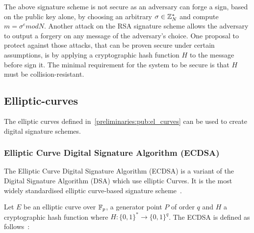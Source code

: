 The above signature scheme is not secure as an adversary can forge a sign, based on the public key alone, by choosing an arbitrary $\sigma \in \mathbb{Z}^{*}_{N}$ and compute $m = \sigma^{e}modN$. Another attack on the RSA signature scheme allows the adversary to output a forgery on any message of the adversary's choice. One proposal to protect against those attacks, that can be proven secure under certain assumptions, is by applying a cryptographic hash function $H$ to the message before sign it. The minimal requirement for the system to be secure is that $H$ must be collision-resistant.

\subsection{Elliptic-curves}
\label{preliminaries:sign:el_curves}

The elliptic curves defined in~\ref{preliminaries:pub:el_curves} can be used to create digital signature schemes.

\subsubsection{Elliptic Curve Digital Signature Algorithm (ECDSA)}
\label{preliminaries:sign:el_curves:ecdsa}

The Elliptic Curve Digital Signature Algorithm (ECDSA) is a variant of the Digital Signature Algorithm (DSA) which use elliptic Curves. It is the most widely standardised elliptic curve-based signature scheme~\cite{elliptic_curves_2}.

Let $E$ be an elliptic curve over $\mathbb{F}_p$, a generator point $P$ of order $q$ and $H$ a cryptographic hash function where $H: \{0, 1\}^{*} \rightarrow  \{0, 1\}^{q}$. The ECDSA is defined as follows~\cite{elliptic_curves_2}:

